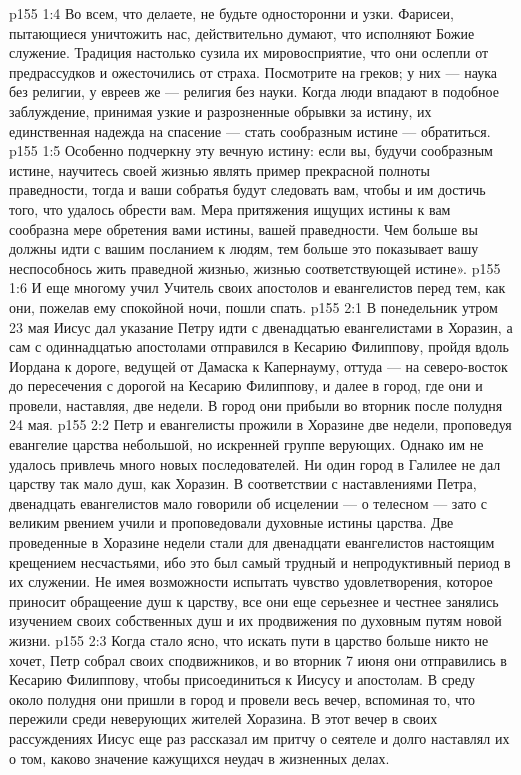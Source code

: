 \vs p155 1:4 Во всем, что делаете, не будьте односторонни и узки. Фарисеи, пытающиеся уничтожить нас, действительно думают, что исполняют Божие служение. Традиция настолько сузила их мировосприятие, что они ослепли от предрассудков и ожесточились от страха. Посмотрите на греков; у них --- наука без религии, у евреев же --- религия без науки. Когда люди впадают в подобное заблуждение, принимая узкие и разрозненные обрывки за истину, их единственная надежда на спасение --- стать сообразным истине --- обратиться.
\vs p155 1:5 Особенно подчеркну эту вечную истину: если вы, будучи сообразным истине, научитесь своей жизнью являть пример прекрасной полноты праведности, тогда и ваши собратья будут следовать вам, чтобы и им достичь того, что удалось обрести вам. Мера притяжения ищущих истины к вам сообразна мере обретения вами истины, вашей праведности. Чем больше вы должны идти с вашим посланием к людям, тем больше это показывает вашу неспособнось жить праведной жизнью, жизнью соответствующей истине».
\vs p155 1:6 И еще многому учил Учитель своих апостолов и евангелистов перед тем, как они, пожелав ему спокойной ночи, пошли спать.
\vs p155 2:1 В понедельник утром 23 мая Иисус дал указание Петру идти с двенадцатью евангелистами в Хоразин, а сам с одиннадцатью апостолами отправился в Кесарию Филиппову, пройдя вдоль Иордана к дороге, ведущей от Дамаска к Капернауму, оттуда --- на северо\hyp{}восток до пересечения с дорогой на Кесарию Филиппову, и далее в город, где они и провели, наставляя, две недели. В город они прибыли во вторник после полудня 24 мая.
\vs p155 2:2 Петр и евангелисты прожили в Хоразине две недели, проповедуя евангелие царства небольшой, но искренней группе верующих. Однако им не удалось привлечь много новых последователей. Ни один город в Галилее не дал царству так мало душ, как Хоразин. В соответствии с наставлениями Петра, двенадцать евангелистов мало говорили об исцелении --- о телесном --- зато с великим рвением учили и проповедовали духовные истины царства. Две проведенные в Хоразине недели стали для двенадцати евангелистов настоящим крещением несчастьями, ибо это был самый трудный и непродуктивный период в их служении. Не имея возможности испытать чувство удовлетворения, которое приносит обращеение душ к царству, все они еще серьезнее и честнее занялись изучением своих собственных душ и их продвижения по духовным путям новой жизни.
\vs p155 2:3 Когда стало ясно, что искать пути в царство больше никто не хочет, Петр собрал своих сподвижников, и во вторник 7 июня они отправились в Кесарию Филиппову, чтобы присоединиться к Иисусу и апостолам. В среду около полудня они пришли в город и провели весь вечер, вспоминая то, что пережили среди неверующих жителей Хоразина. В этот вечер в своих рассуждениях Иисус еще раз рассказал им притчу о сеятеле и долго наставлял их о том, каково значение кажущихся неудач в жизненных делах.
